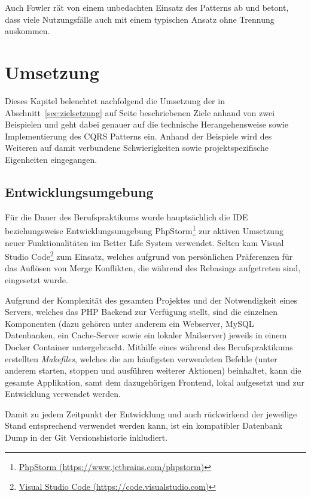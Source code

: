 \documentclass[a4paper,12pt,twoside]{scrreprt}
\begin{document}
Auch Fowler rät von einem unbedachten Einsatz des Patterns ab und betont, dass viele Nutzungsfälle auch mit einem typischen Ansatz ohne Trennung auskommen. \parencite[][]{fowler_cqrs_2011}

\chapter{Umsetzung}
\label{chap:Umsetzung}
Dieses Kapitel beleuchtet nachfolgend die Umsetzung der in Abschnitt~\ref{sec:zielsetzung} auf Seite \pageref{sec:zielsetzung} beschriebenen Ziele anhand von zwei Beispielen und geht dabei genauer auf die technische Herangehensweise sowie Implementierung des CQRS Patterns ein. Anhand der Beispiele wird des Weiteren auf damit verbundene Schwierigkeiten sowie projektspezifische Eigenheiten eingegangen.

\section{Entwicklungsumgebung}
\label{sec:entwicklungsumgebung}
Für die Dauer des Berufspraktikums wurde hauptsächlich die IDE beziehungsweise Entwicklungsumgebung PhpStorm\footnote{\href{https://www.jetbrains.com/phpstorm}{PhpStorm (https://www.jetbrains.com/phpstorm)}} zur aktiven Umsetzung neuer Funktionalitäten im Better Life System verwendet. Selten kam Visual Studio Code\footnote{\href{https://code.visualstudio.com}{Visual Studio Code (https://code.visualstudio.com)}} zum Einsatz, welches aufgrund von persönlichen Präferenzen für das Auflösen von Merge Konflikten, die während des Rebasings aufgetreten sind, eingesetzt wurde.

\smallskip

Aufgrund der Komplexität des gesamten Projektes und der Notwendigkeit eines Servers, welches das PHP Backend zur Verfügung stellt, sind die einzelnen Komponenten (dazu gehören unter anderem ein Webserver, MySQL Datenbanken, ein Cache-Server sowie ein lokaler Mailserver) jeweils in einem Docker Container untergebracht. Mithilfe eines während des Berufspraktikums erstellten \textit{Makefiles}, welches die am häufigsten verwendeten Befehle (unter anderem starten, stoppen und ausführen weiterer Aktionen) beinhaltet, kann die gesamte Applikation, samt dem dazugehörigen Frontend, lokal aufgesetzt und zur Entwicklung verwendet werden.

Damit zu jedem Zeitpunkt der Entwicklung und auch rückwirkend der jeweilige Stand entsprechend verwendet werden kann, ist ein kompatibler Datenbank Dump in der Git Versionshistorie inkludiert.
\end{document}
